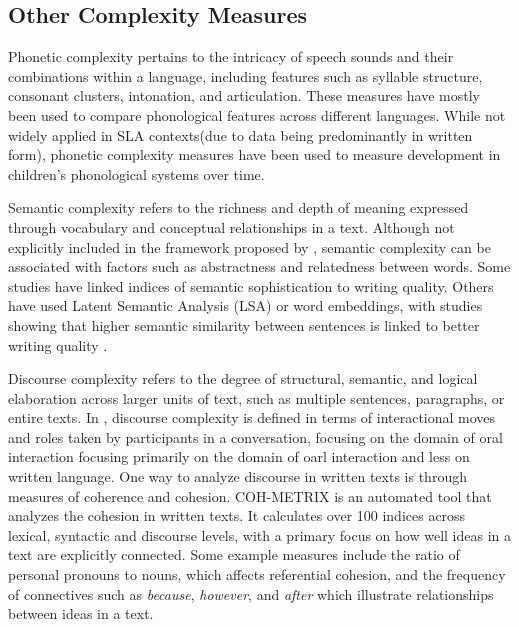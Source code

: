 \subsection{Other Complexity Measures}

Phonetic complexity pertains to the intricacy of speech sounds and their combinations within a language, including
features such as syllable structure, consonant clusters, intonation, and articulation\citep{Maddieson2009}.
These measures have mostly been used to compare phonological features across different languages. While not
widely applied in SLA contexts(due to data being predominantly in written form), phonetic complexity measures have
been
used to measure development in
children's
phonological systems over time\citep{StoelGammon2010}.

Semantic complexity refers to the richness and depth of meaning expressed through vocabulary and conceptual
relationships in a text. Although not explicitly included in the framework proposed by \cite{Butle2012}, semantic
complexity can be associated with factors such as abstractness and relatedness between words. Some studies have
linked indices of semantic sophistication to writing quality\citep{Kyle2018}. Others have used Latent Semantic
Analysis (LSA) or word embeddings, with studies showing that higher semantic similarity between sentences is linked to
better
writing
quality
\citep{Crossley2011, Briscoe2010}.

Discourse complexity refers to the degree of structural, semantic, and logical elaboration across larger units of
text, such as multiple sentences, paragraphs, or entire texts. In \cite{Butle2012}, discourse complexity is
defined in
terms of
interactional moves and roles taken by participants in a conversation, focusing on the domain of
oral
interaction focusing primarily on the domain of oarl interaction and less on written language. One way to analyze
discourse in written texts is through measures of
coherence and cohesion.
COH-METRIX \cite{Graesser2004} is an automated tool that analyzes the cohesion in written texts. It calculates over
100 indices across lexical, syntactic and discourse levels, with a primary focus on how well ideas in a text are
explicitly connected. Some example measures include the ratio of personal pronouns to nouns, which affects
referential cohesion, and the frequency of connectives
such as \textit{because}, \textit{however}, and \textit{after} which illustrate relationships between ideas in a text.


